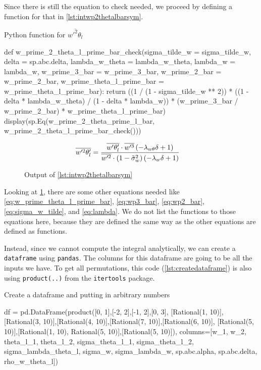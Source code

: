 Since there is still the equation to check needed,
we proceed by defining a function for that in \cref{lst:intwp2thetalbarsym}.
\begin{listing}[!ht]
    \caption{Python function for $\overline{w'^2\theta_l}$}
    \label{lst:intwp2thetalbarsym}
    \begin{pythoncode}
        def w_prime_2_theta_l_prime_bar_check(sigma_tilde_w = sigma_tilde_w, 
            delta = sp.abc.delta, lambda_w_theta = lambda_w_theta, lambda_w = lambda_w, 
            w_prime_3_bar = w_prime_3_bar, w_prime_2_bar = w_prime_2_bar, 
            w_prime_theta_l_prime_bar = w_prime_theta_l_prime_bar):
            return ((1 / (1 - sigma_tilde_w ** 2)) *
                ((1 - delta * lambda_w_theta) / (1 - delta * lambda_w)) *
                (w_prime_3_bar / w_prime_2_bar) *
                w_prime_theta_l_prime_bar)
        display(sp.Eq(w_prime_2_theta_prime_l_bar, w_prime_2_theta_l_prime_bar_check()))
    \end{pythoncode}
\end{listing}
\begin{figure}[!ht]
    \centering
    \caption{Output of \cref{lst:intwp2thetalbarsym}}
    \label{fig:intwp2thetalbarsymout}
    \begin{align}
        \nonumber
        \overline{w'^2\theta'_l}
        &= \frac{\overline{w'\theta'_l} \cdot \overline{w'^3} \left(- \lambda_{w\theta} \delta + 1\right)}{\overline{w'^2} \cdot \left(1 - \Tilde{\sigma}_w^{2}\right) \left(- \lambda_{w} \delta + 1\right)}
    \end{align}
\end{figure}
Looking at \cref{fig:intwp2thetalbarsymout},
there are some other equations needed like \cref{eq:w_prime_theta_l_prime_bar},
\cref{eq:wp3_bar}, \cref{eq:wp2_bar}, \cref{eq:sigma_w_tilde}, and \cref{eq:lambda}.
We do not list the functions to those equations here,
because they are defined the same way as the other equations are defined as functions.

Instead, since we cannot compute the integral analytically,
we can create a \texttt{dataframe}
using \texttt{pandas}\autocite{mckinney-proc-scipy-2010}.
The columns for this dataframe are going to be all the inputs we have.
To get all permutations,
this code (\cref{lst:createdataframe}) is also using \texttt{product(..)}
from the \texttt{itertools} package.
\begin{listing}[!ht]
    \caption{Create a dataframe and putting in arbitrary numbers}
    \label{lst:createdataframe}
    \begin{pythoncode}
        df = pd.DataFrame(product([0, 1],[-2, 2],[-1, 2],[0, 3], [Rational(1, 10)],
            [Rational(3, 10)],[Rational(4, 10)],[Rational(7, 10)],[Rational(6, 10)],
            [Rational(5, 10)],[Rational(1, 10), Rational(5, 10)],[Rational(5, 10)]),
            columns=[w_1, w_2, theta_l_1, theta_l_2, sigma_theta_l_1, sigma_theta_l_2, 
            sigma_lambda_theta_l, sigma_w, sigma_lambda_w, sp.abc.alpha, sp.abc.delta,
            rho_w_theta_l])
    \end{pythoncode}
\end{listing}


